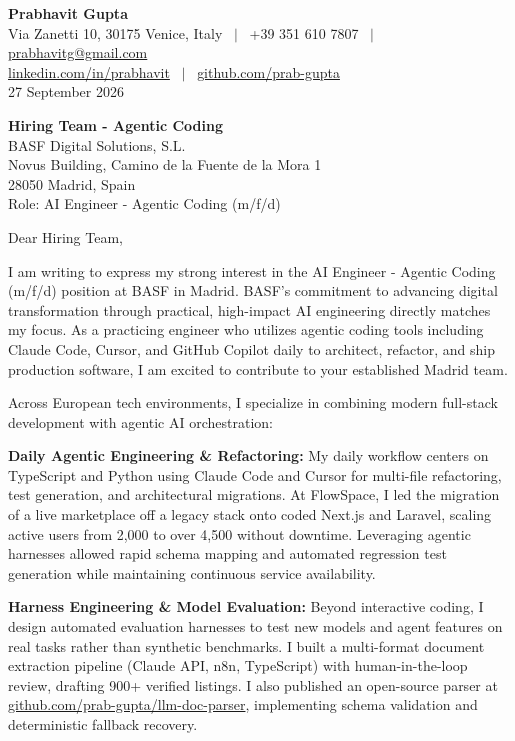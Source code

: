 \documentclass[10.5pt,a4paper]{article}
\begin{document}
\textbf{\large Prabhavit Gupta}\\
Via Zanetti 10, 30175 Venice, Italy ~$\vert$~ +39 351 610 7807 ~$\vert$~ \href{mailto:prabhavitg@gmail.com}{prabhavitg@gmail.com}\\
\href{https://www.linkedin.com/in/prabhavit/}{linkedin.com/in/prabhavit} ~$\vert$~ \href{https://github.com/prab-gupta}{github.com/prab-gupta}\\
27 September 2026

\textbf{Hiring Team - Agentic Coding}\\
BASF Digital Solutions, S.L.\\
Novus Building, Camino de la Fuente de la Mora 1\\
28050 Madrid, Spain\\
Role: AI Engineer - Agentic Coding (m/f/d)

Dear Hiring Team,

I am writing to express my strong interest in the AI Engineer - Agentic Coding (m/f/d) position at BASF in Madrid. BASF's commitment to advancing digital transformation through practical, high-impact AI engineering directly matches my focus. As a practicing engineer who utilizes agentic coding tools including Claude Code, Cursor, and GitHub Copilot daily to architect, refactor, and ship production software, I am excited to contribute to your established Madrid team.

Across European tech environments, I specialize in combining modern full-stack development with agentic AI orchestration:

\textbf{Daily Agentic Engineering \& Refactoring:} My daily workflow centers on TypeScript and Python using Claude Code and Cursor for multi-file refactoring, test generation, and architectural migrations. At FlowSpace, I led the migration of a live marketplace off a legacy stack onto coded Next.js and Laravel, scaling active users from 2,000 to over 4,500 without downtime. Leveraging agentic harnesses allowed rapid schema mapping and automated regression test generation while maintaining continuous service availability.

\textbf{Harness Engineering \& Model Evaluation:} Beyond interactive coding, I design automated evaluation harnesses to test new models and agent features on real tasks rather than synthetic benchmarks. I built a multi-format document extraction pipeline (Claude API, n8n, TypeScript) with human-in-the-loop review, drafting 900+ verified listings. I also published an open-source parser at \href{https://github.com/prab-gupta/llm-doc-parser}{github.com/prab-gupta/llm-doc-parser}, implementing schema validation and deterministic fallback recovery.
\end{document}
